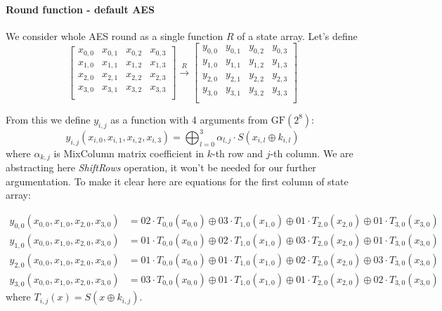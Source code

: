 \documentclass[11pt,oneside,final]{fithesis2}
\newcommand{\gfe}{\ensuremath{\text{GF}\left(2^8\right)}}
\begin{document}
	\paragraph*{Round function - default AES}
	We consider whole AES round as a single function $R$ of a state array. Let's define
	\[
	\begin{bmatrix} 
	    x_{0,0} & x_{0,1} & x_{0,2} & x_{0,3}\\
	    x_{1,0} & x_{1,1} & x_{1,2} & x_{1,3}\\
	    x_{2,0} & x_{2,1} & x_{2,2} & x_{2,3}\\
	    x_{3,0} & x_{3,1} & x_{3,2} & x_{3,3}\\
	\end{bmatrix} 
	\overset{R}{\longrightarrow}
	\begin{bmatrix} 
	    y_{0,0} & y_{0,1} & y_{0,2} & y_{0,3}\\
	    y_{1,0} & y_{1,1} & y_{1,2} & y_{1,3}\\
	    y_{2,0} & y_{2,1} & y_{2,2} & y_{2,3}\\
	    y_{3,0} & y_{3,1} & y_{3,2} & y_{3,3}\\
	\end{bmatrix} 
	\]

	From this we define $y_{i,j}$ as a function with 4 arguments from $\gfe$:
	\begin{equation}
	y_{i,j}\left(x_{i,0}, x_{i,1}, x_{i,2}, x_{i,3}\right) = \bigoplus^3_{l=0} \alpha_{l,j} \cdot S(x_{i,l} \oplus k_{i,l})
	\end{equation}
	where $\alpha_{k,j}$ is MixColumn matrix coefficient in $k$-th row and $j$-th column. We are abstracting here \emph{ShiftRows} operation, it won't be needed for our further argumentation.
	To make it clear here are equations for the first column of state array:

	{\footnotesize
	\begin{subequations}
	\begin{align}
	y_{0,0}\left(x_{0,0}, x_{1,0}, x_{2,0}, x_{3,0}\right) &= 02 \cdot T_{0,0}(x_{0,0}) \oplus 03 \cdot T_{1,0}(x_{1,0})\oplus 01 \cdot T_{2,0}(x_{2,0})\oplus 01 \cdot T_{3,0}(x_{3,0})\\
	y_{1,0}\left(x_{0,0}, x_{1,0}, x_{2,0}, x_{3,0}\right) &= 01 \cdot T_{0,0}(x_{0,0}) \oplus 02 \cdot T_{1,0}(x_{1,0})\oplus 03 \cdot T_{2,0}(x_{2,0})\oplus 01 \cdot T_{3,0}(x_{3,0})\\
	y_{2,0}\left(x_{0,0}, x_{1,0}, x_{2,0}, x_{3,0}\right) &= 01 \cdot T_{0,0}(x_{0,0}) \oplus 01 \cdot T_{1,0}(x_{1,0})\oplus 02 \cdot T_{2,0}(x_{2,0})\oplus 03 \cdot T_{3,0}(x_{3,0})\\
	y_{3,0}\left(x_{0,0}, x_{1,0}, x_{2,0}, x_{3,0}\right) &= 03 \cdot T_{0,0}(x_{0,0}) \oplus 01 \cdot T_{1,0}(x_{1,0})\oplus 01 \cdot T_{2,0}(x_{2,0})\oplus 02 \cdot T_{3,0}(x_{3,0})
	\end{align}
	\end{subequations}}
	where $T_{i,j}(x) = S\left(x \oplus k_{i,j}\right)$.
\end{document}
